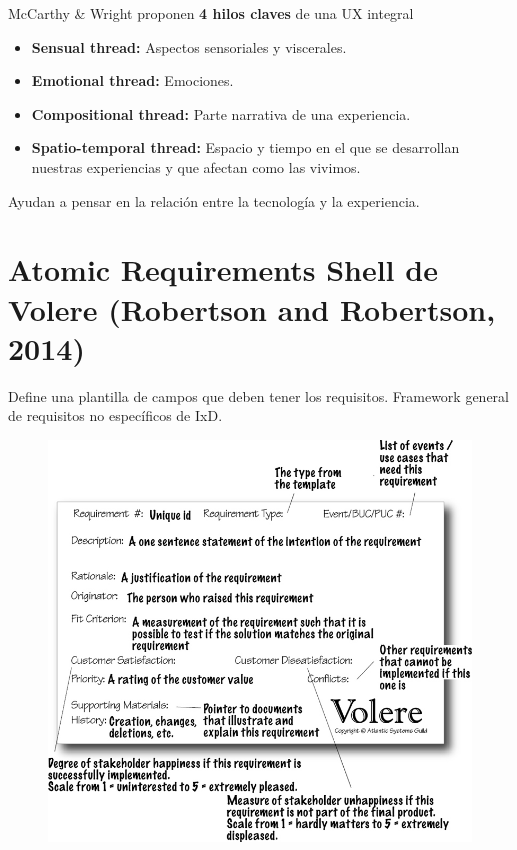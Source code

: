 \documentclass[12pt, twoside, openright]{report} %
\begin{document}
McCarthy \& Wright proponen \textbf{4 hilos claves} de una UX integral

\begin{itemize}

\item
\textbf{Sensual thread:} Aspectos sensoriales y viscerales.
\item
\textbf{Emotional thread:} Emociones.
\item
\textbf{Compositional thread:} Parte narrativa de una experiencia.
\item
\textbf{Spatio-temporal thread:} Espacio y tiempo en el que se desarrollan
  nuestras experiencias y que afectan como las vivimos.
\end{itemize}

Ayudan a pensar en la relación entre la tecnología y la experiencia.

\newpage

\section{Atomic Requirements Shell de Volere (Robertson and
Robertson, 2014)}

Define una plantilla de campos que deben tener los requisitos. Framework
general de requisitos no específicos de IxD.
\begin{figure}[H]
	{\includegraphics[scale=.4]{2_9_volere_snow_card_alt.jpg}}
\end{figure}
\end{document}
